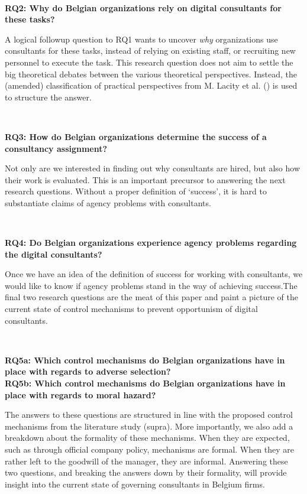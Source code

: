 \documentclass[
  man,floatsintext]{apa6}
\begin{document}
\(~\)

\textbf{RQ2: Why do Belgian organizations rely on digital consultants for these tasks?}

A logical followup question to RQ1 wants to uncover \emph{why} organizations use consultants for these tasks, instead of relying on existing staff, or recruiting new personnel to execute the task. This research question does not aim to settle the big theoretical debates between the various theoretical perspectives. Instead, the (amended) classification of practical perspectives from M. Lacity et al. () is used to structure the answer.

\(~\)

\textbf{RQ3: How do Belgian organizations determine the success of a consultancy assignment?}

Not only are we interested in finding out why consultants are hired, but also how their work is evaluated. This is an important precursor to answering the next research questions. Without a proper definition of `success', it is hard to substantiate claims of agency problems with consultants.

\(~\)

\textbf{RQ4: Do Belgian organizations experience agency problems regarding the digital consultants?}

Once we have an idea of the definition of success for working with consultants, we would like to know if agency problems stand in the way of achieving success.The final two research questions are the meat of this paper and paint a picture of the current state of control mechanisms to prevent opportunism of digital consultants.

\(~\)

\textbf{RQ5a: Which control mechanisms do Belgian organizations have in place with regards to adverse selection?}\\
\textbf{RQ5b: Which control mechanisms do Belgian organizations have in place with regards to moral hazard?}

The answers to these questions are structured in line with the proposed control mechanisms from the literature study (supra). More importantly, we also add a breakdown about the formality of these mechanisms. When they are expected, such as through official company policy, mechanisms are formal. When they are rather left to the goodwill of the manager, they are informal. Answering these two questions, and breaking the answers down by their formality, will provide insight into the current state of governing consultants in Belgium firms.
\end{document}
